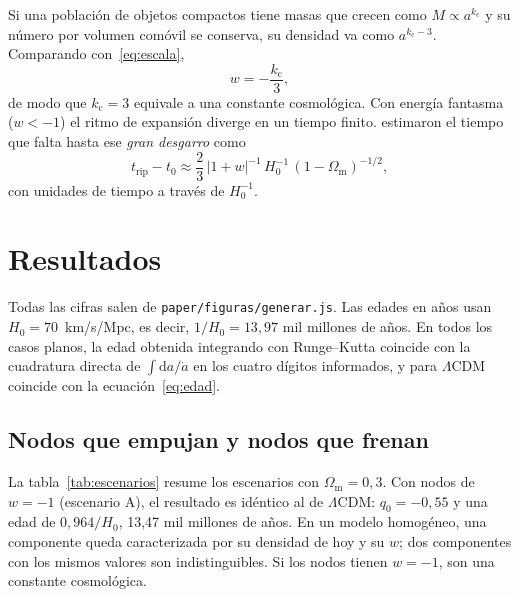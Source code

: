 \documentclass[11pt,a4paper]{article}
\begin{document}
Si una población de objetos compactos tiene masas que crecen como $M \propto a^{k_{\mathrm c}}$ y su número por volumen comóvil se conserva, su densidad va como $a^{k_{\mathrm c} - 3}$. Comparando con~\eqref{eq:escala},
\begin{equation}\label{eq:acople}
w = -\frac{k_{\mathrm c}}{3},
\end{equation}
de modo que $k_{\mathrm c} = 3$ equivale a una constante cosmológica. Con energía fantasma ($w < -1$) el ritmo de expansión diverge en un tiempo finito. \textcite{caldwell2003} estimaron el tiempo que falta hasta ese \emph{gran desgarro} como
\begin{equation}\label{eq:desgarro}
t_{\mathrm{rip}} - t_0 \approx \frac23\, |1 + w|^{-1}\, H_0^{-1}\, (1 - \Omega_{\mathrm m})^{-1/2},
\end{equation}
con unidades de tiempo a través de $H_0^{-1}$.

\section{Resultados}\label{sec:resultados}

Todas las cifras salen de \texttt{paper/figuras/generar.js}. Las edades en años usan $H_0 = 70$~km/s/Mpc, es decir, $1/H_0 = 13{,}97$ mil millones de años. En todos los casos planos, la edad obtenida integrando con Runge--Kutta coincide con la cuadratura directa de $\int \mathrm{d}a/\dot a$ en los cuatro dígitos informados, y para $\Lambda$CDM coincide con la ecuación~\eqref{eq:edad}.

\subsection{Nodos que empujan y nodos que frenan}

La tabla~\ref{tab:escenarios} resume los escenarios con $\Omega_{\mathrm m} = 0{,}3$. Con nodos de $w = -1$ (escenario A), el resultado es idéntico al de $\Lambda$CDM: $q_0 = -0{,}55$ y una edad de $0{,}964/H_0$, 13,47 mil millones de años. En un modelo homogéneo, una componente queda caracterizada por su densidad de hoy y su $w$; dos componentes con los mismos valores son indistinguibles. Si los nodos tienen $w = -1$, son una constante cosmológica.
\end{document}

